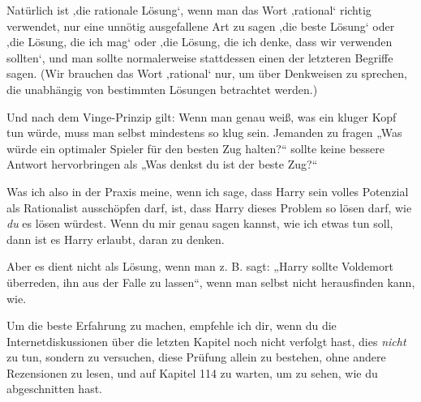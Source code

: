 {%
Natürlich ist ‚die rationale Lösung‘, wenn man das Wort ‚rational‘ richtig verwendet, nur eine unnötig ausgefallene Art zu sagen ‚die beste Lösung‘ oder ‚die Lösung, die ich mag‘ oder ‚die Lösung, die ich denke, dass wir verwenden sollten‘, und man sollte normalerweise stattdessen einen der letzteren Begriffe sagen. (Wir brauchen das Wort ‚rational‘ nur, um über Denkweisen zu sprechen, die unabhängig von bestimmten Lösungen betrachtet werden.)


Und nach dem Vinge-Prinzip gilt: Wenn man genau weiß, was ein kluger Kopf tun würde, muss man selbst mindestens so klug sein. Jemanden zu fragen „Was würde ein optimaler Spieler für den besten Zug halten?“ sollte keine bessere Antwort hervorbringen als „Was denkst du ist der beste Zug?“

Was ich also in der Praxis meine, wenn ich sage, dass Harry sein volles Potenzial als Rationalist ausschöpfen darf, ist, dass Harry dieses Problem so lösen darf, wie \emph{du} es lösen würdest. Wenn du mir genau sagen kannst, wie ich etwas tun soll, dann ist es Harry erlaubt, daran zu denken.

Aber es dient nicht als Lösung, wenn man z. B. sagt: „Harry sollte Voldemort überreden, ihn aus der Falle zu lassen“, wenn man selbst nicht herausfinden kann, wie.

Um die beste Erfahrung zu machen, empfehle ich dir, wenn du die Internetdiskussionen über die letzten Kapitel noch nicht verfolgt hast, dies \emph{nicht} zu tun, sondern zu versuchen, diese Prüfung allein zu bestehen, ohne andere Rezensionen zu lesen, und auf Kapitel 114 zu warten, um zu sehen, wie du abgeschnitten hast.

}

